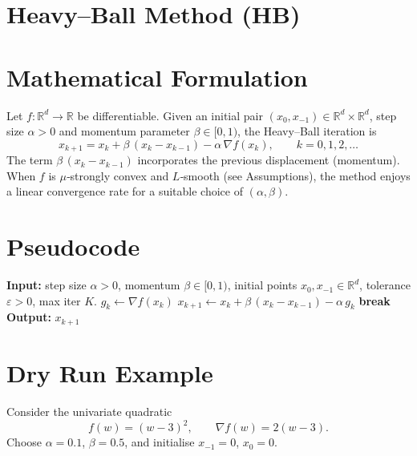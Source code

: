 \documentclass{article}
\newcommand{\R}{\mathbb{R}}
\newcommand{\norm}[1]{\left\lVert #1\right\rVert}
\newcommand{\grad}{\nabla}
\begin{document}
\section*{Heavy–Ball Method (HB)}

\section*{Mathematical Formulation}
Let $f:\R^{d}\rightarrow\R$ be differentiable.  
Given an initial pair $(x_{0},x_{-1})\in\R^{d}\times\R^{d}$, step size $\alpha>0$ and momentum parameter $\beta\in[0,1)$, the Heavy–Ball iteration is
\begin{equation}
\boxed{
x_{k+1}=x_{k}+\beta\,(x_{k}-x_{k-1})-\alpha\,\grad f(x_{k}),\qquad k=0,1,2,\dots
}
\label{eq:HB}
\end{equation}
The term $\beta\,(x_{k}-x_{k-1})$ incorporates the previous displacement (momentum).  
When $f$ is $\mu$‑strongly convex and $L$‑smooth (see Assumptions), the method enjoys a linear convergence rate for a suitable choice of $(\alpha,\beta)$.

\section*{Pseudocode}
\begin{algorithm}[H]
\caption{Heavy–Ball Method}
\begin{algorithmic}[1]
\State \textbf{Input:} step size $\alpha>0$, momentum $\beta\in[0,1)$,
initial points $x_{0},x_{-1}\in\R^{d}$, tolerance $\varepsilon>0$, max iter $K$.
    \State $g_{k}\gets \grad f(x_{k})$
    \State $x_{k+1}\gets x_{k}+\beta\,(x_{k}-x_{k-1})-\alpha\,g_{k}$ 
    \If{$\norm{g_{k}}\le \varepsilon$}
        \State \textbf{break}
    \EndIf
\EndFor
\State \textbf{Output:} $x_{k+1}$
\end{algorithmic}
\end{algorithm}

\section*{Dry Run Example}
Consider the univariate quadratic
\[
f(w)=(w-3)^{2},\qquad \grad f(w)=2(w-3).
\]
Choose $\alpha=0.1$, $\beta=0.5$, and initialise $x_{-1}=0$, $x_{0}=0$.
\end{document}
